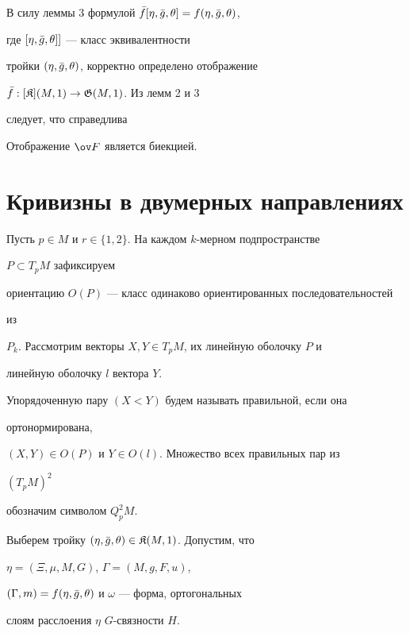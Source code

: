 В силу леммы 3 формулой $\Bar f[\eta,\Bar g,\theta]=f(\eta,\Bar g,\theta)$,


где $[\eta,\Bar g,\theta]]$ --- класс эквивалентности


тройки $(\eta,\Bar g,\theta)$, корректно определено отображение


$\Bar f:[\frak K](M,1)\to\frak G(M,1)$. Из лемм 2 и 3


следует, что справедлива


 


\begin{thm} Отображение $\ov F$ является биекцией. 


\end{thm} 


 


\section{Кривизны в двумерных направлениях} 


 


Пусть $p\in M$ и $r\in\{1,2\}$. На каждом $k$-мерном подпространстве 


$P\subset T_pM$ зафиксируем 


ориентацию $O(P)$ --- класс одинаково ориентированных последовательностей 


из 


$P_k$. Рассмотрим векторы $X,Y\in T_pM$, их линейную оболочку $P$ и 


линейную оболочку $l$ вектора $Y$. 


Упорядоченную пару $(X<Y)$ будем называть правильной, если она 


ортонормирована, 


$(X,Y)\in O(P)$ и $Y\in O(l)$. Множество всех правильных пар из 


$(T_pM)^2$ 


обозначим символом $Q^2_pM$. 


 


Выберем тройку $(\eta,\Bar g,\theta)\in\frak K(M,1)$. Допустим, что 


$\eta=(\Xi,\mu,M,G)$, $\Gamma=(M,g,F,u)$, 


$(\Gamma,m)=f(\eta,\Bar g,\theta)$ и $\omega$ --- форма, ортогональных 


слоям расслоения $\eta$ $G$-связности $H$. 


